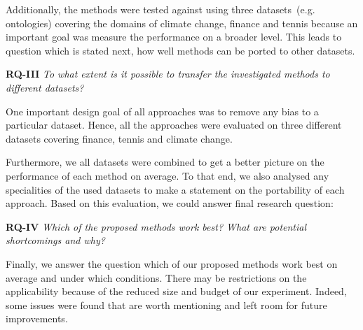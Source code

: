 Additionally, the methods were tested against using three datasets~(e.g. ontologies) covering the domains of climate change, finance and tennis because an important goal was measure the performance on a broader level. This leads to question which is stated next, how well methods can be ported to other datasets. 
 
\textbf{RQ-III} \emph{To what extent is it possible to transfer the investigated methods to different datasets?}

One important design goal of all approaches was to remove any bias to a particular dataset. Hence, all the approaches were evaluated on three different datasets covering finance, tennis and climate change. 

Furthermore, we all datasets were combined to get a better picture on the performance of each method on average. To that end, we also analysed any specialities of the used datasets to make a statement on the portability of each approach. Based on this evaluation, we could answer final research question:

\textbf{RQ-IV} \emph{Which of the proposed methods work best? What are potential shortcomings and why?}

Finally, we answer the question which of our proposed methods work best on average and under which conditions. There may be restrictions on the applicability because of the reduced size and budget of our experiment. Indeed, some issues were found that are worth mentioning and left room for future improvements. 



